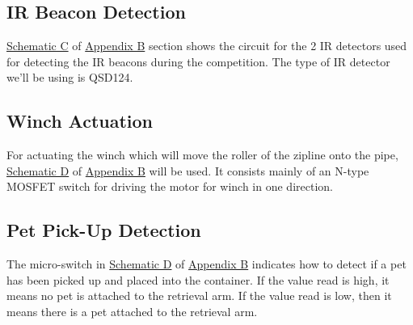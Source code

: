 \documentclass[11pt, oneside]{article} %
\begin{document}
	\subsection{IR Beacon Detection}
	
	\hyperref[sch:C]{Schematic C} of \hyperref[appendixB]{Appendix B} section shows the circuit for the 2 IR detectors used for detecting the IR beacons during the competition. The type of IR detector we'll be using is QSD124. 
	
	\subsection{Winch Actuation}
	
	For actuating the winch which will move the roller of the zipline onto the pipe, \hyperref[sch:D]{Schematic D} of \hyperref[appendixB]{Appendix B} will be used. It consists mainly of an N-type MOSFET switch for driving the motor for winch in one direction. 
	
	\subsection{Pet Pick-Up Detection}
	
	The micro-switch in \hyperref[sch:E]{Schematic D} of \hyperref[appendixB]{Appendix B} indicates how to detect if a pet has been picked up and placed into the container. If the value read is high, it means no pet is attached to the retrieval arm. If the value read is low, then it means there is a pet attached to the retrieval arm. 
	
\end{document}
